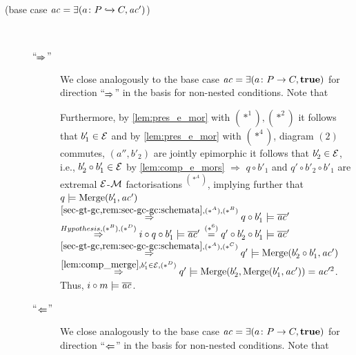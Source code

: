 \begin{description}
\item[(base case $\mathit{ac}=\exists(a\colon P \xhookrightarrow{} C,\mathit{ac}')$)]
\ 
\begin{description}
\item[``$\Trans{}$''] We close analogously to the base case $\mathit{ac}=\exists(a\colon P \to C,\textbf{true})$ for direction ``$\Trans{}$'' in the basis for non-nested conditions.
Note that 
Furthermore, by \cref{lem:pres_e_mor} with $(*^1),(*^2)$ it follows that $b'_1 \in \mathcal{E}$ and by \cref{lem:pres_e_mor} with $(*^4)$, diagram $(2)$ commutes, $(a'',b'_2)$ are jointly epimorphic it follows that $b'_2 \in \mathcal{E}$, i.e., $b'_2 \circ b'_1 \in \mathcal{E}$ by \cref{lem:comp_e_mors} $\Rightarrow$ $q \circ b'_1$ and $q' \circ b'_2 \circ b'_1$ are extremal $\mathcal{E}$-${\cal M}$ factorisations $^{(*^A)}$, implying further that $q \models \mathrm{Merge}(b'_1,\mathit{ac}')$ $\stackrel{\cref{sec-gt-gc,rem:sec-gc-gc:schemata},(*^A),(*^B)}{\Rightarrow} q \circ b'_1 \models \ol{\ac}'$ $\stackrel{Hypothesis,(*^B),(*^D)}{\Rightarrow} i \circ q \circ b'_1 \models \overline{\mathit{ac}}'$ $\stackrel{(*^6)}{=} q' \circ b'_2 \circ b'_1 \models \overline{\mathit{ac}}'$ $\stackrel{\cref{sec-gt-gc,rem:sec-gc-gc:schemata},(*^A),(*^C)}{\Rightarrow} q' \models \Merge(b'_2 \circ b'_1,\ac')$ $\stackrel{\cref{lem:comp_merge},b'_1 \in \E,(*^D)}{\Rightarrow} q' \models \Merge(b'_2,\Merge(b'_1,\ac'))=\ac'^2$.
Thus, $i \circ m \models \overline{\mathit{ac}}$.
\item[``$\TransB{}$''] We close analogously to the base case $\mathit{ac}=\exists(a\colon P \to C,\textbf{true})$ for direction ``$\TransB{}$'' in the basis for non-nested conditions.
Note that 
\end{description}
\end{description}
